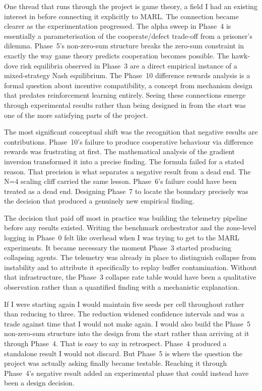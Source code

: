 \begin{appendices}
One thread that runs through the project is game theory, a field I had an existing interest in before connecting it explicitly to MARL. The connection became clearer as the experimentation progressed. The alpha sweep in Phase~4 is essentially a parameterisation of the cooperate/defect trade-off from a prisoner's dilemma. Phase~5's non-zero-sum structure breaks the zero-sum constraint in exactly the way game theory predicts cooperation becomes possible. The hawk-dove risk equilibria observed in Phase~3 are a direct empirical instance of a mixed-strategy Nash equilibrium. The Phase~10 difference rewards analysis is a formal question about incentive compatibility, a concept from mechanism design that predates reinforcement learning entirely. Seeing these connections emerge through experimental results rather than being designed in from the start was one of the more satisfying parts of the project.

The most significant conceptual shift was the recognition that negative results are contributions. Phase~10's failure to produce cooperative behaviour via difference rewards was frustrating at first. The mathematical analysis of the gradient inversion transformed it into a precise finding. The formula failed for a stated reason. That precision is what separates a negative result from a dead end. The N=4 scaling cliff carried the same lesson. Phase~6's failure could have been treated as a dead end. Designing Phase~7 to locate the boundary precisely was the decision that produced a genuinely new empirical finding.

The decision that paid off most in practice was building the telemetry pipeline before any results existed. Writing the benchmark orchestrator and the zone-level logging in Phase~0 felt like overhead when I was trying to get to the MARL experiments. It became necessary the moment Phase~3 started producing collapsing agents. The telemetry was already in place to distinguish collapse from instability and to attribute it specifically to replay buffer contamination. Without that infrastructure, the Phase~3 collapse rate table would have been a qualitative observation rather than a quantified finding with a mechanistic explanation.

If I were starting again I would maintain five seeds per cell throughout rather than reducing to three. The reduction widened confidence intervals and was a trade against time that I would not make again. I would also build the Phase~5 non-zero-sum structure into the design from the start rather than arriving at it through Phase~4. That is easy to say in retrospect. Phase~4 produced a standalone result I would not discard. But Phase~5 is where the question the project was actually asking finally became testable. Reaching it through Phase~4's negative result added an experimental phase that could instead have been a design decision.


\end{appendices}
